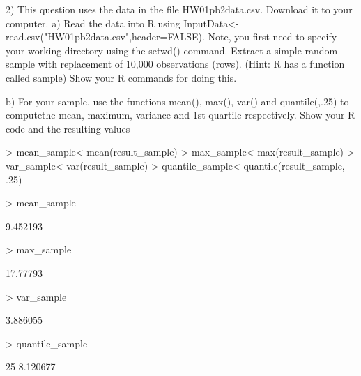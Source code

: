\documentclass[12pt]{article}
\begin{document}
2) This question uses the data in the file HW01pb2data.csv. Download it to your
computer.
\tabularnewline
a) Read the data into R using
InputData<-read.csv("HW01pb2data.csv",header=FALSE). Note, you first need
to specify your working directory using the setwd() command. Extract a simple random
sample with replacement of 10,000 observations (rows). (Hint: R has a function called
sample) Show your R commands for doing this.
\begin{Schunk}
\end{Schunk}
b) For your sample, use the functions mean(), max(), var() and quantile(,.25) to computethe mean, 
maximum, variance and 1st quartile respectively. Show your R code and the resulting values
\tabularnewline
\begin{Schunk}
\begin{Sinput}
> mean_sample<-mean(result_sample)
> max_sample<-max(result_sample)
> var_sample<-var(result_sample)
> quantile_sample<-quantile(result_sample, .25)
\end{Sinput}
\end{Schunk}
\begin{Schunk}
\begin{Sinput}
> mean_sample
\end{Sinput}
\begin{Soutput}
[1] 9.452193
\end{Soutput}
\begin{Sinput}
> max_sample
\end{Sinput}
\begin{Soutput}
[1] 17.77793
\end{Soutput}
\begin{Sinput}
> var_sample
\end{Sinput}
\begin{Soutput}
[1] 3.886055
\end{Soutput}
\begin{Sinput}
> quantile_sample
\end{Sinput}
\begin{Soutput}
     25% 
8.120677 
\end{Soutput}
\end{Schunk}
\end{document}
